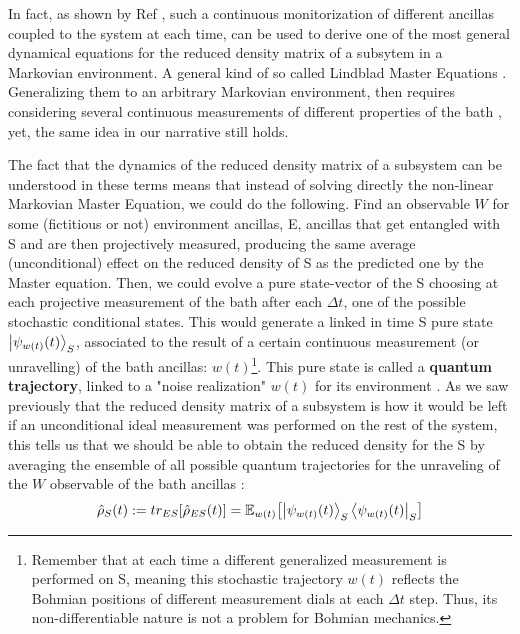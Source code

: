 \documentclass[11pt, a4paper]{article} %
\begin{document}
In fact, as shown by Ref \cite{continousMeas}, such a continuous monitorization of different ancillas coupled to the system at each time, can be used to derive one of the most general dynamical equations for the reduced density matrix of a subsytem in a Markovian environment. A general kind of so called Lindblad Master Equations \cite{Generalized, MarkovianityDefs}. Generalizing them to an arbitrary Markovian environment, then requires considering several continuous measurements of different properties of the bath \cite{continousMeas, MarkovianityDefs}, yet, the same idea in our narrative still holds.

The fact that the dynamics of the reduced density matrix of a subsystem can be understood in these terms means that instead of solving directly the non-linear Markovian Master Equation, we could do the following. Find an observable $W$ for some (fictitious or not) environment ancillas, E, ancillas that get entangled with S and are then projectively measured, producing the same average (unconditional) effect on the reduced density of S as the predicted one by the Master equation. Then, we could evolve a pure state-vector of the S choosing at each projective measurement of the bath after each $\Delta t$, one of the possible stochastic conditional states. This would generate a linked in time S pure state $\ket{\psi_{w(t)}(t)}_S$, associated to the result of a certain continuous measurement (or unravelling) of the bath ancillas: $w(t)$\footnote{Remember that at each time a different generalized measurement is performed on S, meaning this stochastic trajectory $w(t)$ reflects the Bohmian positions of different measurement dials at each $\Delta t$ step. Thus, its non-differentiable nature is not a problem for Bohmian mechanics.}. This pure state is called a {\bf quantum trajectory}, linked to a "noise realization" $w(t)$ for its environment \cite{Generalized, MarkovianityDefs, QuantumTrajs}. As we saw previously that the reduced density matrix of a subsystem is how it would be left if an unconditional ideal measurement was performed on the rest of the system, this tells us that we should be able to obtain the reduced density for the S by averaging the ensemble of all possible quantum trajectories for the unraveling of the $W$ observable of the bath ancillas \cite{MarkovianityDefs,QuantumTrajs}:
\begin{equation}
\hat{\rho}_S(t):=tr_{ES}[\hat{\rho}_{ES}(t)]=\mathbb{E}_{w(t)}\qty[\ket{\psi_{w(t)}(t)}_S\bra{\psi_{w(t)}(t)}_S]
\end{equation}
\end{document}
